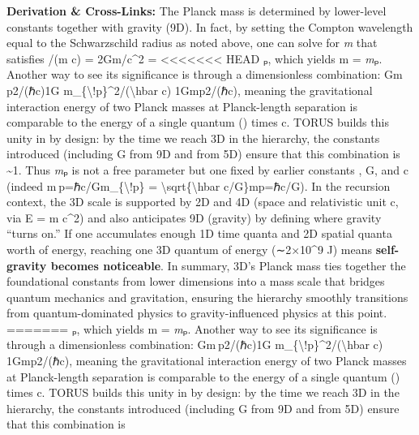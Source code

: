 \documentclass[]{article}
\begin{document}
\textbf{Derivation \& Cross-Links:} The Planck mass is determined by
lower-level constants together with gravity (9D). In fact, by setting
the Compton wavelength equal to the Schwarzschild radius as noted above,
one can solve for \emph{m} that satisfies \hbar/(m c) = 2Gm/c\^{}2 =
<<<<<<< HEAD
\emph{\ell}ₚ, which yields m = \emph{m}ₚ\hspace{0pt}. Another way to see
its significance is through a dimensionless combination: Gm ⁣p2/(ℏc)\approx1G
m\_\{\textbackslash!p\}\^{}2/(\textbackslash hbar c) \approx
1Gmp2\hspace{0pt}/(ℏc)\hspace{0pt}, meaning the gravitational
interaction energy of two Planck masses at Planck-length separation is
comparable to the energy of a single quantum (\hbar) times c. TORUS builds
this unity in by design: by the time we reach 3D in the hierarchy, the
constants introduced (including G from 9D and \hbar from 5D) ensure that
this combination is \textasciitilde1\hspace{0pt}. Thus \emph{m}ₚ is not
a free parameter but one fixed by earlier constants \hbar, G, and c (indeed
m ⁣p=ℏc/Gm\_\{\textbackslash!p\} =
\textbackslash sqrt\{\textbackslash hbar
c/G\}mp\hspace{0pt}=ℏc/G\hspace{0pt}). In the recursion context, the 3D
scale is supported by 2D and 4D (space and relativistic unit c, via E =
m c\^{}2) and also anticipates 9D (gravity) by defining where gravity
``turns on.'' If one accumulates enough 1D time quanta and 2D spatial
quanta worth of energy, reaching one 3D quantum of energy (∼2×10\^{}9 J)
means \textbf{self-gravity becomes noticeable}\hspace{0pt}. In summary,
3D's Planck mass ties together the foundational constants from lower
dimensions into a mass scale that bridges quantum mechanics and
gravitation, ensuring the hierarchy smoothly transitions from
quantum-dominated physics to gravity-influenced physics at this point.
=======
\emph{\ell}ₚ, which yields m = \emph{m}ₚ​. Another way to see its
significance is through a dimensionless combination: Gm ⁣p2/(ℏc)\approx1G
m\_\{\textbackslash{}!p\}\^{}2/(\textbackslash{}hbar c) \approx
1Gmp2​/(ℏc)​, meaning the gravitational interaction energy of two
Planck masses at Planck-length separation is comparable to the energy of
a single quantum (\hbar) times c. TORUS builds this unity in by design: by
the time we reach 3D in the hierarchy, the constants introduced
(including G from 9D and \hbar from 5D) ensure that this combination is
\end{document}
